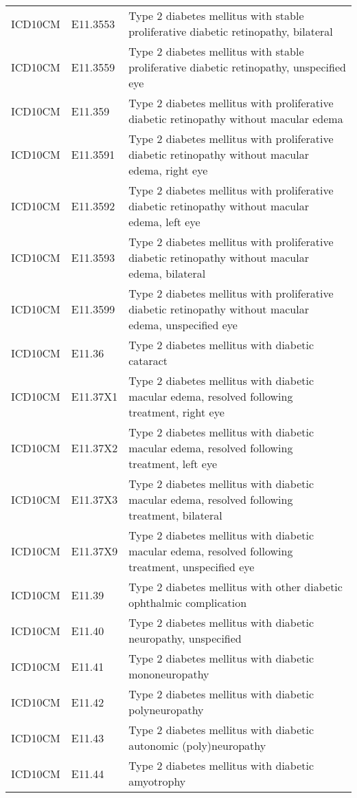 \begin{longtable}{p{}p{}p{}}
  ICD10CM & E11.3553 & Type 2 diabetes mellitus with stable proliferative diabetic retinopathy, bilateral \\ 
  ICD10CM & E11.3559 & Type 2 diabetes mellitus with stable proliferative diabetic retinopathy, unspecified eye \\ 
  ICD10CM & E11.359 & Type 2 diabetes mellitus with proliferative diabetic retinopathy without macular edema \\ 
  ICD10CM & E11.3591 & Type 2 diabetes mellitus with proliferative diabetic retinopathy without macular edema, right eye \\ 
  ICD10CM & E11.3592 & Type 2 diabetes mellitus with proliferative diabetic retinopathy without macular edema, left eye \\ 
  ICD10CM & E11.3593 & Type 2 diabetes mellitus with proliferative diabetic retinopathy without macular edema, bilateral \\ 
  ICD10CM & E11.3599 & Type 2 diabetes mellitus with proliferative diabetic retinopathy without macular edema, unspecified eye \\ 
  ICD10CM & E11.36 & Type 2 diabetes mellitus with diabetic cataract \\ 
  ICD10CM & E11.37X1 & Type 2 diabetes mellitus with diabetic macular edema, resolved following treatment, right eye \\ 
  ICD10CM & E11.37X2 & Type 2 diabetes mellitus with diabetic macular edema, resolved following treatment, left eye \\ 
  ICD10CM & E11.37X3 & Type 2 diabetes mellitus with diabetic macular edema, resolved following treatment, bilateral \\ 
  ICD10CM & E11.37X9 & Type 2 diabetes mellitus with diabetic macular edema, resolved following treatment, unspecified eye \\ 
  ICD10CM & E11.39 & Type 2 diabetes mellitus with other diabetic ophthalmic complication \\ 
  ICD10CM & E11.40 & Type 2 diabetes mellitus with diabetic neuropathy, unspecified \\ 
  ICD10CM & E11.41 & Type 2 diabetes mellitus with diabetic mononeuropathy \\ 
  ICD10CM & E11.42 & Type 2 diabetes mellitus with diabetic polyneuropathy \\ 
  ICD10CM & E11.43 & Type 2 diabetes mellitus with diabetic autonomic (poly)neuropathy \\ 
  ICD10CM & E11.44 & Type 2 diabetes mellitus with diabetic amyotrophy \\ 

\end{longtable}
